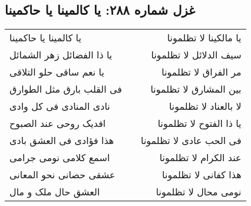 \begin{center}
\section*{غزل شماره ۲۸۸: یا کالمینا یا حاکمینا}
\label{sec:0288}
\begin{longtable}{l p{0.5cm} r}
یا کالمینا یا حاکمینا
&&
یا مالکینا لا تظلمونا
\\
یا ذا الفضائل زهر الشمائل
&&
سیف الدلائل لا تظلمونا
\\
یا نعم ساقی حلو التلاقی
&&
مر الفراق لا تظلمونا
\\
فی القلب بارق مثل الطوارق
&&
بین المشارق لا تظلمونا
\\
نادی المنادی فی کل وادی
&&
لا بالعناد لا تظلمونا
\\
افدیک روحی عند الصبوح
&&
یا ذا الفتوح لا تظلمونا
\\
هذا فؤادی فی العشق بادی
&&
فی الحب عادی لا تظلمونا
\\
اسمع کلامی نومی جرامی
&&
عند الکرام لا تظلمونا
\\
عشقی حصانی نحو المعانی
&&
هذا کفانی لا تظلمونا
\\
العشق حال ملک و مال
&&
نومی محال لا تظلمونا
\\
\end{longtable}
\end{center}
